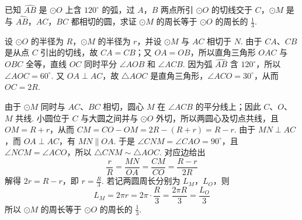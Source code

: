 \begin{problem}
已知 \(\widehat{AB}\) 是 \(\odot O\) 上含 \(120^\circ\) 的弧，过 \(A\)，\(B\) 两点所引 \(\odot O\) 的切线交于 \(C\)，\(\odot M\) 是与 \(\widehat{AB}\)，\(AC\)，\(BC\) 都相切的圆，求证 \(\odot M\) 的周长等于 \(\odot O\) 的周长的 \(\frac{1}{3}\).
\end{problem}

\begin{solution}
设 \(\odot O\) 的半径为 \(R\)，\(\odot M\) 的半径为 \(r\)，并设 \(\odot M\) 与 \(AC\) 相切于 \(N\). 由于 \(CA\)、\(CB\) 是从点 \(C\) 引出的切线，故 \(CA=CB\)；又 \(OA=OB\)，所以直角三角形 \(OAC\) 与 \(OBC\) 全等，直线 \(OC\) 同时平分 \(\angle AOB\) 和 \(\angle ACB\). 因为弧 \(\widehat{AB}\) 含 \(120^\circ\)，所以 \(\angle AOC=60^\circ\). 又 \(OA\perp AC\)，故 \(\triangle AOC\) 是直角三角形，\(\angle ACO=30^\circ\)，从而 \(OC=2R\).


由于 \(\odot M\) 同时与 \(AC\)、\(BC\) 相切，圆心 \(M\) 在 \(\angle ACB\) 的平分线上；因此 \(C\)、\(O\)、\(M\) 共线. 小圆位于 \(C\) 与大圆之间并与 \(\odot O\) 外切，所以两圆心及切点共线，且 \(OM=R+r\)，从而 \(CM=CO-OM=2R-(R+r)=R-r\). 由于 \(MN\perp AC\)，而 \(OA\perp AC\)，有 \(MN\parallel OA\). 于是 \(\angle CNM=\angle CAO=90^\circ\)，且 \(\angle NCM=\angle ACO\)，所以 \(\triangle CNM\sim\triangle AOC\). 对应边给出
\[
\frac{r}{R}=\frac{MN}{OA}=\frac{CM}{CO}=\frac{R-r}{2R}
\]
解得 \(2r=R-r\)，即 \(r=\frac{R}{3}\). 若记两圆周长分别为 \(L_M\)，\(L_O\)，则
\[
L_M=2\pi r=2\pi\cdot\frac{R}{3}=\frac{2\pi R}{3}=\frac{L_O}{3}
\]
所以 \(\odot M\) 的周长等于 \(\odot O\) 的周长的 \(\frac{1}{3}\).
\end{solution}
